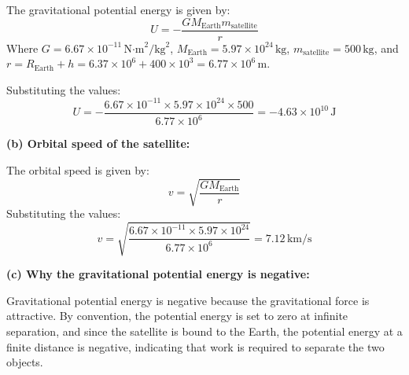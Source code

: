 \documentclass[addpoints]{exam}
\begin{document}
\begin{questions}
\begin{solution}[8cm]
The gravitational potential energy is given by:  
\[
U = -\frac{G M_{\text{Earth}} m_{\text{satellite}}}{r}
\]  
Where \( G = 6.67 \times 10^{-11} \, \text{N·m}^2/\text{kg}^2 \), \( M_{\text{Earth}} = 5.97 \times 10^{24} \, \text{kg} \), \( m_{\text{satellite}} = 500 \, \text{kg} \), and \( r = R_{\text{Earth}} + h = 6.37 \times 10^6 + 400 \times 10^3 = 6.77 \times 10^6 \, \text{m} \).  

Substituting the values:  
\[
U = -\frac{6.67 \times 10^{-11} \times 5.97 \times 10^{24} \times 500}{6.77 \times 10^6} = -4.63 \times 10^{10} \, \text{J}
\]  

\textbf{(b) Orbital speed of the satellite:}

The orbital speed is given by:  
\[
v = \sqrt{\frac{GM_{\text{Earth}}}{r}}
\]  
Substituting the values:  
\[
v = \sqrt{\frac{6.67 \times 10^{-11} \times 5.97 \times 10^{24}}{6.77 \times 10^6}} = 7.12 \, \text{km/s}
\]  

\textbf{(c) Why the gravitational potential energy is negative:}

Gravitational potential energy is negative because the gravitational force is attractive. By convention, the potential energy is set to zero at infinite separation, and since the satellite is bound to the Earth, the potential energy at a finite distance is negative, indicating that work is required to separate the two objects.

\end{solution}


\end{questions}
\end{document}
